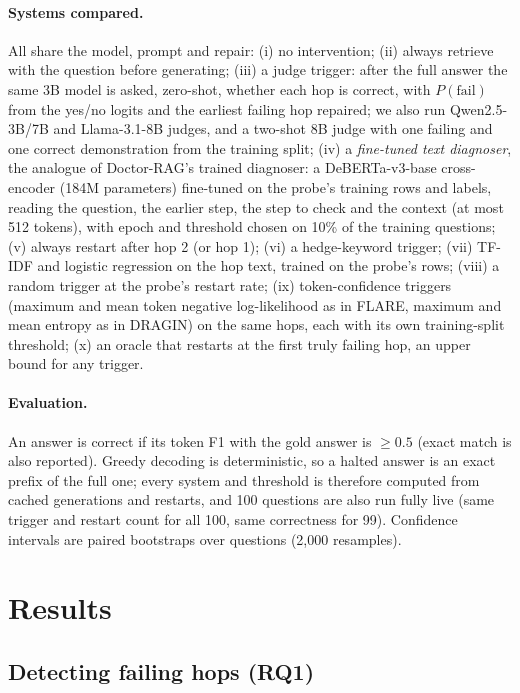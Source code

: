 \documentclass[11pt]{article}
\begin{document}
\paragraph{Systems compared.} All share the model, prompt and repair: (i) no intervention; (ii) always retrieve with the question before generating; (iii) a judge trigger: after the full answer the same 3B model is asked, zero-shot, whether each hop is correct, with $P(\text{fail})$ from the yes/no logits and the earliest failing hop repaired; we also run Qwen2.5-3B/7B \citep{yang2024qwen25} and Llama-3.1-8B judges, and a two-shot 8B judge with one failing and one correct demonstration from the training split; (iv) a \emph{fine-tuned text diagnoser}, the analogue of Doctor-RAG's trained diagnoser: a DeBERTa-v3-base cross-encoder \citep{he2023debertav3} (184M parameters) fine-tuned on the probe's training rows and labels, reading the question, the earlier step, the step to check and the context (at most 512 tokens), with epoch and threshold chosen on 10\% of the training questions; (v) always restart after hop 2 (or hop 1); (vi) a hedge-keyword trigger; (vii) TF-IDF and logistic regression on the hop text, trained on the probe's rows; (viii) a random trigger at the probe's restart rate; (ix) token-confidence triggers (maximum and mean token negative log-likelihood as in FLARE, maximum and mean entropy as in DRAGIN) on the same hops, each with its own training-split threshold; (x) an oracle that restarts at the first truly failing hop, an upper bound for any trigger.

\paragraph{Evaluation.} An answer is correct if its token F1 with the gold answer is $\geq 0.5$ (exact match is also reported). Greedy decoding is deterministic, so a halted answer is an exact prefix of the full one; every system and threshold is therefore computed from cached generations and restarts, and 100 questions are also run fully live (same trigger and restart count for all 100, same correctness for 99). Confidence intervals are paired bootstraps over questions (2,000 resamples).

\section{Results}

\subsection{Detecting failing hops (RQ1)}
\end{document}
